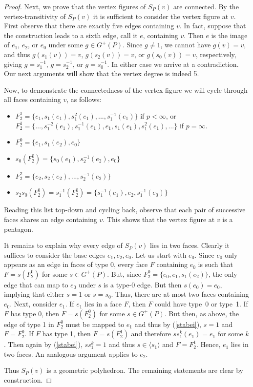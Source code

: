 \documentclass[12pt]{article}
\theoremstyle{definition}\newtheorem{definition}{Definition}[section]
\begin{document}
\begin{proof}
Next, we prove that the vertex figures of ${S}_P(v)$ are connected. By the vertex-transitivity of $S_P(v)$ it is sufficient to consider the vertex figure  at $v$. First observe that there are exactly five edges containing $v$. In fact, suppose that the construction leads to a sixth edge, call it $e$, containing $v$. Then $e$ is the image of $e_1$, $e_2$, or $e_0$ under some $g \in G^+(P)$. Since $g\neq 1$, we cannot have $g(v)=v$, and thus $g(s_1(v))=v$, $g(s_2(v))=v$, or $g(s_0(v)) = v$, respectively, giving $g=s_1^{-1}$, $g=s_2^{-1}$, or $g=s_0^{-1}$. In either case we arrive at a contradiction. Our next arguments will show that the vertex degree is indeed 5.

Now, to demonstrate the connectedness of the vertex figure we will cycle through all faces containing $v$, as follows:
\begin{itemize}
    \item $F_2^{1} = \{e_1, s_1(e_1), s_1^2(e_1), ... , s_1^{-1}(e_1)\}$ if $p<\infty$, or\\
    $F_2^{1} = \{\ldots,s_1^{-2}(e_1),s_1^{-1}(e_1), e_1, s_1(e_1), s_1^2(e_1),\ldots\}$ if $p=\infty$.
    \item $F_2^{0} = \{e_1, s_1(e_2), e_0\}$
    \item $s_0(F_2^{0}) = \{s_0(e_1), s_2^{-1}(e_2), e_0\}$
    \item $F_2^{2} = \{e_2, s_2(e_2), ... , s_2^{-1}(e_2)\}$
    \item $s_2s_0(F_2^{0}) = s_1^{-1}(F_2^0) = \{s_1^{-1}(e_1), e_2, s_1^{-1}(e_0)\}$
\end{itemize}
Reading this list top-down and cycling back, observe that each pair of successive faces shares an edge containing $v$. This shows that the vertex figure at $v$ is a pentagon.

It remains to explain why every edge of $S_P(v)$ lies in two faces. Clearly it suffices to consider the base edges $e_1, e_2, e_0$. Let us start with $e_0$. Since $e_0$ only appears as an edge in faces of type 0, every face $F$ containing $e_0$ is such that $F=s(F_2^0)$ for some $s\in G^+(P)$. But, since $F_2^0 = \{e_0, e_1, s_1(e_2)\}$, the only edge that can map to $e_0$ under $s$ is a type-0 edge. But then $s(e_0) = e_0$, implying that either $s = 1$ or $s = s_0$. Thus, there are at most two faces containing $e_0$. Next, consider $e_1$. If $e_1$ lies in a face $F$, then $F$ could have type~0 or type~1. If $F$ has type 0, then $F=s(F_2^0)$ for some $s\in G^+(P)$. But then, as above, the edge of type 1 in $F_2^0$ must be mapped to $e_1$ and thus by (\ref{stabei}), $s = 1$ and $F=F_2^0$. If $F$ has type 1, then $F=s(F_2^1)$ and therefore $ss_1^k(e_1) = e_1$ for some $k$. Then again by (\ref{stabei}), $ss_1^k = 1$ and thus $s \in \langle s_1 \rangle$ and $F = F_2^1$. Hence, $e_1$ lies in two faces. An analogous argument applies to  $e_2$. 

Thus ${S}_P(v)$ is a geometric polyhedron. The remaining statements are clear by construction.
\end{proof}
\smallskip
\end{document}
